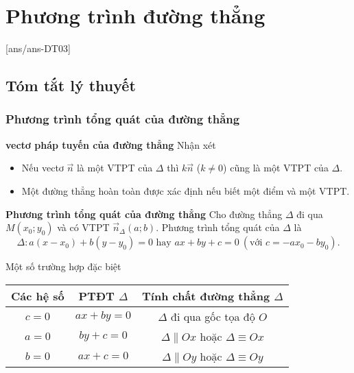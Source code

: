 \setcounter{section}{2}
\setcounter{dang}{0}
\section{Phương trình đường thẳng}
[ans/ans-DT03]
\subsection{Tóm tắt lý thuyết}

\subsubsection{Phương trình tổng quát của đường thẳng}

\textbf{vectơ pháp tuyến của đường thẳng}
	Nhận xét
	\begin{itemize}
		\item Nếu vectơ $\overrightarrow{n}$  là một VTPT của $\Delta$ thì $k \overrightarrow{n}$ ($k \ne 0 $) cũng là một VTPT của $\Delta$. 
		\item Một đường thẳng hoàn toàn được xác định nếu biết một điểm và một VTPT.
	\end{itemize}

\textbf{Phương trình tổng quát của đường thẳng}
	Cho đường thẳng $\Delta$ đi qua $M(x_0;y_0)$ và có VTPT $\overrightarrow{n}_{\Delta} (a;b)$. Phương trình tổng quát của $\Delta$ là 
	$$\Delta \colon a(x-x_0) +b(y-y_0) = 0 \text{ hay } ax+by+c=0 ~(\text{với } c=-ax_0-by_0).$$

 Một số trường hợp đặc biệt
	\begin{center}
		\renewcommand{\arraystretch}{2}%
		\begin{tabular}{|c|c|c|}
			\hline 
			Các hệ số & PTĐT $\Delta$ & Tính chất đường thẳng $\Delta$ \\ 
			\hline 
			$c=0$ & $ax+by =0$ & $\Delta$ đi qua gốc tọa độ $O$ \\ 
			\hline 
			$a=0$ & $by+c=0$ & $\Delta \parallel Ox$ hoặc $\Delta  \equiv Ox$ \\ 
			\hline 
			$b=0$ & $ax+c=0$ &  $\Delta \parallel Oy$ hoặc $\Delta  \equiv Oy$ \\ 
			\hline 
		\end{tabular} 
	\end{center}


